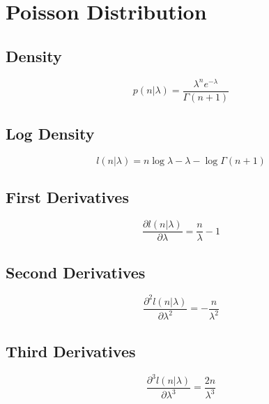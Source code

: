 \documentclass[11pt]{article}
\begin{document}
\section*{Poisson Distribution}

\subsection*{Density}

\begin{equation*}
p \! \left( n | \lambda \right)
=
\frac{\lambda^{n} e^{-\lambda} }{\Gamma \! \left( n + 1 \right) }
\end{equation*}

\subsection*{Log Density}

\begin{equation*}
l \! \left( n | \lambda \right)
=
n \log \lambda - \lambda - \log \Gamma \! \left( n + 1 \right)
\end{equation*}

\subsection*{First Derivatives}

\begin{equation*}
\frac{ \partial l \! \left( n | \lambda \right) }{ \partial \lambda }
=
\frac{n}{\lambda} - 1
\end{equation*}

\subsection*{Second Derivatives}

\begin{equation*}
\frac{ \partial^{2} l \! \left( n | \lambda \right) }{ \partial \lambda^{2} }
=
- \frac{n}{\lambda^{2}} 
\end{equation*}

\subsection*{Third Derivatives}

\begin{equation*}
\frac{ \partial^{3} l \! \left( n | \lambda \right) }{ \partial \lambda^{3} }
=
\frac{2 n}{\lambda^{3}}
\end{equation*}
\end{document}
